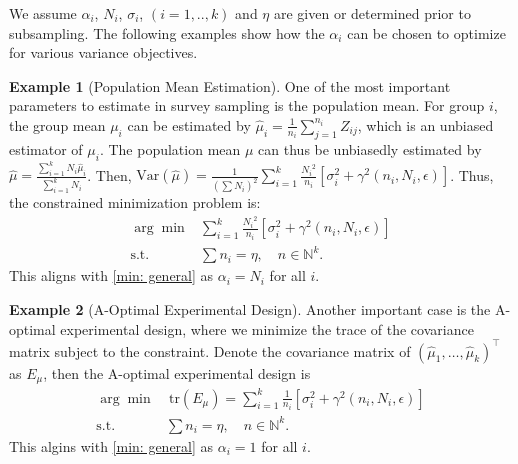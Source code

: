 \documentclass{article}
\newcommand{\var}{\text{Var}}
\theoremstyle{definition}
\newtheorem{example}{Example}
\begin{document}
We assume $\alpha_i$, $N_i$, $\sigma_i$, $(i=1,..,k)$ and $\eta$ are given or determined prior to subsampling. The following examples show how the $\alpha_i$ can be chosen to optimize for various variance objectives. 
\begin{example}[Population Mean Estimation]
    One of the most important parameters to estimate in survey sampling is the population mean. For group $i$, the group mean $\mu_i$ can be estimated by 
        $\hat{\mu}_i = \frac{1}{n_i} \sum_{j=1}^{n_i} Z_{ij}$, 
    which is an unbiased estimator of $\mu_i$. The population mean $\mu$ can thus be unbiasedly estimated by 
        $\hat{\mu} = \frac{\sum_{i=1}^k N_i \hat{\mu}_i}{\sum_{i=1}^k N_i}$. 
    Then, $\var (\hat{\mu}) = \frac{1}{(\sum N_i)^2} \sum_{i=1}^k \frac{{N_i}^2}{n_i} \left[ \sigma_i^2 + \gamma^2 (n_i, N_i, \epsilon) \right]$. Thus, the constrained minimization problem is:
    \begin{align} \label{min: population variance objective}
        {\arg\min}& \sum_{i=1}^k \frac{{N_i}^2}{n_i} \left[ \sigma_i^2 + \gamma^2 (n_i, N_i, \epsilon) \right] \\
        \text{s.t.}& \sum n_i = \eta, \quad n \in \mathbb{N}^k. \nonumber
    \end{align}
    This aligns with \eqref{min: general} as $\alpha_i = N_i$ for all $i$.
\end{example}

\begin{example}[A-Optimal Experimental Design]
     Another important case is the A-optimal experimental design, where we minimize the trace of the covariance matrix subject to the constraint. Denote the covariance matrix of $(\hat{\mu}_1,\ldots,\hat{\mu}_k)^{\top}$ as $E_{\mu}$, then the A-optimal experimental design is
    \begin{align} \label{min: A-optimal objective}
        \arg \min& \ \text{tr}(E_{\mu}) = \sum_{i=1}^k \frac{1}{n_i} \left[ \sigma_i^2 + \gamma^2 (n_i, N_i, \epsilon) \right] \\
        \text{s.t.}& \sum n_i = \eta, \quad n \in \mathbb{N}^k. \nonumber
    \end{align}
    This algins with \eqref{min: general} as $\alpha_i = 1$ for all $i$.
\end{example}
\end{document}
